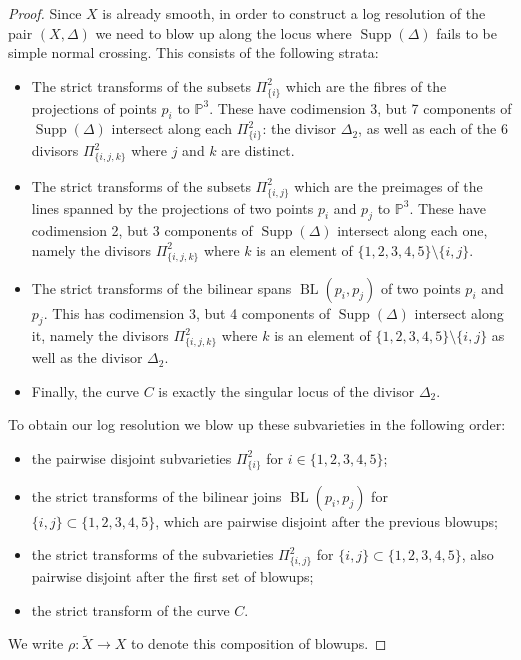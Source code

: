 \documentclass[a4paper,11pt]{article}
\newcommand{\PP}{\mathbb P}
\newcommand{\arrow}{\rightarrow}
\newcommand{\BL}{\operatorname{BL}}
\begin{document}
\begin{proof}
Since $X$ is already smooth, in order to construct a log resolution of the pair $(X,\Delta)$ we need to blow up along the locus where $\operatorname{Supp}(\Delta)$ fails to be simple normal crossing. This consists of the following strata:
\begin{itemize}
    \item The strict transforms of the subsets $\Pi_{\{i\}}^2$ which are the fibres of the projections of points $p_i$ to $\PP^3$. These have codimension 3, but 7 components of $\operatorname{Supp}(\Delta)$ intersect along each $\Pi_{\{i\}}^2$: the divisor $\Delta_2$, as well as each of the 6 divisors $\Pi^2_{\{i,j,k\}}$ where $j$ and $k$ are distinct.
    \item The strict transforms of the subsets $\Pi_{\{i,j\}}^2$ which are the preimages of the lines spanned by the projections of two points $p_i$ and $p_j$ to $\PP^3$. These have codimension 2, but 3 components of $\operatorname{Supp}(\Delta)$ intersect along each one, namely the divisors $\Pi^2_{\{i,j,k\}}$ where $k$ is an element of $\{1,2,3,4,5\} \setminus \{i,j\}$.
    \item The strict transforms of the bilinear spans $\BL(p_i,p_j)$ of two points $p_i$ and $p_j$. This has codimension 3, but 4 components of $\operatorname{Supp}(\Delta)$ intersect along it, namely the divisors $\Pi^2_{\{i,j,k\}}$ where $k$ is an element of $\{1,2,3,4,5\} \setminus \{i,j\}$ as well as the divisor $\Delta_2$.
    \item Finally, the curve $C$ is exactly the singular locus of the divisor $\Delta_2$.
\end{itemize}
To obtain our log resolution we blow up these subvarieties in the following order:
\begin{itemize}
    \item the pairwise disjoint subvarieties $\Pi_{\{i\}}^2$ for $i \in \{1,2,3,4,5\}$;
    \item the strict transforms of the bilinear joins $\BL(p_i,p_j)$ for $\{i,j\} \subset \{1,2,3,4,5\}$, which are pairwise disjoint after the previous blowups;
    \item the strict transforms of the subvarieties $\Pi_{\{i,j\}}^2$ for $\{i,j\} \subset \{1,2,3,4,5\}$, also pairwise disjoint after the first set of blowups;
    \item the strict transform of the curve $C$. 
\end{itemize}
We write $\rho \colon \widetilde{X} \arrow X$ to denote this composition of blowups.


\end{proof}
\end{document}
